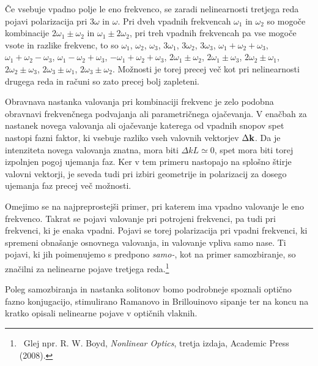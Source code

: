 Če vsebuje vpadno polje le eno frekvenco, se zaradi nelinearnosti tretjega
reda pojavi polarizacija pri 3$\omega$ in $\omega$. Pri dveh vpadnih
frekvencah $\omega_{1}$ in $\omega_{2}$ so mogoče kombinacije $2\omega_{1}\pm\omega_{2}$
in $\omega_{1}\pm2\omega_{2}$, pri treh vpadnih frekvencah pa vse
mogoče vsote in razlike frekvenc, to so $\omega_1$, $\omega_2$, $\omega_3$, 
$3\omega_1$, $3 \omega_2$, $3\omega_3$, 
$\omega_1 + \omega_2 + \omega_3$, $\omega_1 + \omega_2 - \omega_3$, 
$\omega_1 - \omega_2 + \omega_3$, $- \omega_1 + \omega_2 + \omega_3$, 
$2 \omega_1\pm\omega_2$, $2 \omega_1\pm\omega_3$, $2 \omega_2\pm\omega_1$,
$2 \omega_2\pm\omega_3$, $2 \omega_3\pm\omega_1$, $2 \omega_3\pm\omega_2$.
Možnosti je torej precej več kot pri nelinearnosti drugega reda in računi so zato 
precej bolj zapleteni.

Obravnava nastanka valovanja pri
kombinaciji frekvenc je zelo podobna obravnavi frekvenčnega podvajanja ali  parametričnega
ojačevanja. V enačbah za nastanek novega valovanja ali ojačevanje
katerega od vpadnih snopov spet nastopi fazni faktor, ki vsebuje razliko
vseh valovnih vektorjev $\Delta{\bf k}$. Da je intenziteta novega
valovanja znatna, mora biti $\Delta kL\simeq0$, spet mora biti torej
izpolnjen pogoj ujemanja faz. Ker v tem primeru nastopajo na splošno štirje
valovni vektorji, je seveda tudi pri izbiri geometrije in polarizacij
za dosego ujemanja faz precej več možnosti.

Omejimo se na najpreprostejši primer, pri katerem ima vpadno valovanje le eno 
frekvenco. Takrat se pojavi valovanje pri potrojeni frekvenci, pa tudi
pri frekvenci, ki je enaka vpadni. Pojavi se torej polarizacija pri 
vpadni frekvenci, ki spremeni obnašanje osnovnega valovanja, in valovanje vpliva samo nase.
Ti pojavi, ki jih poimenujemo s predpono {\it samo-}, kot na primer samozbiranje, so
značilni za nelinearne pojave tretjega reda.\footnote{~Glej 
npr. R. W. Boyd, {\it Nonlinear Optics}, tretja izdaja, Academic Press (2008).}

Poleg samozbiranja in nastanka solitonov bomo podrobneje spoznali optično fazno konjugacijo, 
stimulirano Ramanovo in Brillouinovo sipanje ter na koncu na kratko opisali nelinearne pojave v
optičnih vlaknih.

